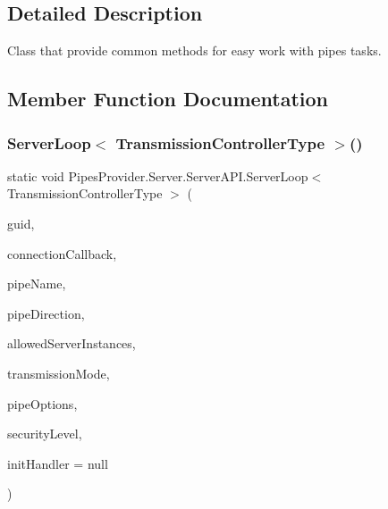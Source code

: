 \subsection{Detailed Description}
Class that provide common methods for easy work with pipes\textquotesingle{} tasks. 



\subsection{Member Function Documentation}
\mbox{\label{class_pipes_provider_1_1_server_1_1_server_a_p_i_aaf9afb864cf452d3842f0a6546569a32}} 
\subsubsection{\texorpdfstring{Server\+Loop$<$ Transmission\+Controller\+Type $>$()}{ServerLoop< TransmissionControllerType >()}}
{\footnotesize\ttfamily static void Pipes\+Provider.\+Server.\+Server\+A\+P\+I.\+Server\+Loop$<$ Transmission\+Controller\+Type $>$ (\begin{DoxyParamCaption}\item[{string}]{guid,  }\item[{System.\+Action$<$ \mbox{\hyperlink{class_pipes_provider_1_1_server_1_1_transmission_controllers_1_1_base_server_transmission_controller}{Base\+Server\+Transmission\+Controller}} $>$}]{connection\+Callback,  }\item[{string}]{pipe\+Name,  }\item[{Pipe\+Direction}]{pipe\+Direction,  }\item[{int}]{allowed\+Server\+Instances,  }\item[{Pipe\+Transmission\+Mode}]{transmission\+Mode,  }\item[{Pipe\+Options}]{pipe\+Options,  }\item[{\mbox{\hyperlink{namespace_pipes_provider_1_1_security_a1a6020eca1c661a6f7140e8260502d7e}{Security.\+Security\+Level}}}]{security\+Level,  }\item[{System.\+Action$<$ \mbox{\hyperlink{class_pipes_provider_1_1_server_1_1_transmission_controllers_1_1_base_server_transmission_controller}{Base\+Server\+Transmission\+Controller}} $>$}]{init\+Handler = {\ttfamily null} }\end{DoxyParamCaption})\hspace{0.3cm}{\ttfamily [static]}}



